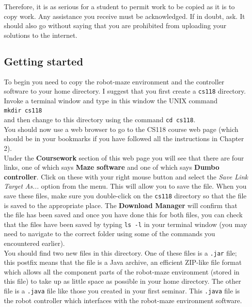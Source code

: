 \noindent
Therefore, it is as serious for a student to permit work to be copied as it
is to copy work. Any assistance you receive must be acknowledged.
If in doubt, ask. It should also go without saying that you are prohibited 
from uploading your solutions to the internet.

\subsection{Getting started}

To begin you need to copy the robot-maze environment and 
the controller software to your home directory. I suggest that you first 
create a {\tt cs118} directory. Invoke a terminal window and type in 
this window the UNIX command \\

{\tt mkdir cs118} \\

\noindent
and then change to this directory using the command {\tt cd cs118}. \\

\noindent
You should now use a web browser to go to the CS118 course web page 
(which should be in your bookmarks if you have followed all the instructions
in Chapter 2). \\

\noindent 
Under the {\bf Coursework} section of this web page you will see that there 
are four links, one of which says {\bf Maze software} and one of which says 
{\bf Dumbo controller}. Click on these with your right mouse button and 
select the {\em Save Link Target As...} option from the menu. This will allow you 
to save the file. When you save these files, make sure you double-click on the 
{\tt cs118} directory so that the file is saved to the appropriate place.
The {\bf Download Manager} will confirm that the file has been saved and 
once you have done this for both files, you can check that the files have 
been saved by typing {\tt ls -l} in your terminal window (you may need to navigate
to the correct folder using some of the commands you encountered earlier).\\

\noindent
You should find two new files in this directory. 
One of these files is a {\tt .jar} file;  
this postfix means that the file is a Java archive, an 
efficient ZIP-like file format which allows all the component parts of the 
robot-maze environment (stored in this file) to take up as little space as 
possible in your home directory. The other file is a {\tt .java} file 
like those you created in your first seminar. This {\tt .java} file is the 
robot controller which interfaces with the robot-maze environment software. \\

